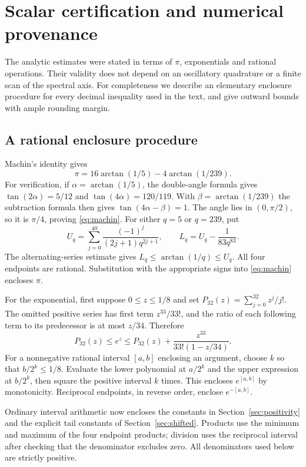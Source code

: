 \section{Scalar certification and numerical provenance}\label{sec:certification}

The analytic estimates were stated in terms of $\pi$, exponentials and
rational operations. Their validity does not depend on an oscillatory
quadrature or a finite scan of the spectral axis. For completeness we
describe an elementary enclosure procedure for every decimal inequality
used in the text, and give outward bounds with ample rounding margin.

\subsection{A rational enclosure procedure}

Machin's identity gives
\begin{equation}\label{eq:machin}
 \pi=16\arctan(1/5)-4\arctan(1/239).
\end{equation}
For verification, if $\alpha=\arctan(1/5)$, the double-angle formula gives
$\tan(2\alpha)=5/12$ and $\tan(4\alpha)=120/119$.
With $\beta=\arctan(1/239)$ the subtraction formula then gives
$\tan(4\alpha-\beta)=1$. The angle lies in $(0,\pi/2)$, so it is
$\pi/4$, proving \eqref{eq:machin}. For either $q=5$ or $q=239$, put
\[
 U_q=\sum_{j=0}^{40}\frac{(-1)^j}{(2j+1)q^{2j+1}},\qquad
 L_q=U_q-\frac1{83q^{83}}.
\]
The alternating-series estimate gives
$L_q\le\arctan(1/q)\le U_q$.
All four endpoints are rational. Substitution with the appropriate
signs into \eqref{eq:machin} encloses $\pi$.

For the exponential, first suppose $0\le z\le1/8$ and set
$P_{32}(z)=\sum_{j=0}^{32}z^j/j!$. The omitted positive series has first
term $z^{33}/33!$, and the ratio of each following term to its predecessor
is at most $z/34$. Therefore
\begin{equation}\label{eq:exp-enclosure}
 P_{32}(z)\le e^z\le
 P_{32}(z)+\frac{z^{33}}{33!(1-z/34)}.
\end{equation}
For a nonnegative rational interval $[a,b]$ enclosing an argument, choose
$k$ so that $b/2^k\le1/8$. Evaluate the lower polynomial at $a/2^k$ and
the upper expression at $b/2^k$, then square the positive interval $k$
times. This encloses $e^{[a,b]}$ by monotonicity. Reciprocal endpoints,
in reverse order, enclose $e^{-[a,b]}$.

Ordinary interval arithmetic now encloses the constants in
Section~\ref{sec:positivity} and the explicit tail constants of
Section~\ref{sec:shifted}. Products use the minimum and maximum of the
four endpoint products; division uses the reciprocal interval after
checking that the denominator excludes zero. All denominators used below
are strictly positive.

